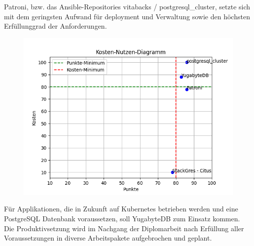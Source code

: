 \documentclass{ksgr_styles}
\begin{document}
\begin{managementsummary}
\begin{flushleft}
            Patroni, bzw. das \Gls{Ansible}-Repositories vitabacks / postgresql\_cluster, setzte sich mit dem geringsten Aufwand für deployment und Verwaltung sowie den höchsten Erfüllunggrad der Anforderungen.\\
    \begin{figure}[H]
        \centering
        \includegraphics[width=0.75\linewidth]{source/cost_benefit_diagram/cost_benefit_diagram}
        \label{fig:cost_benefit_diagram_management_summary}
    \end{figure}
            Für Applikationen, die in Zukunft auf \Gls{Kubernetes} betrieben werden und eine \Gls{PostgreSQL} Datenbank voraussetzen, soll YugabyteDB zum Einsatz kommen.\\
            Die Produktivsetzung wird im Nachgang der Diplomarbeit nach Erfüllung aller Voraussetzungen in diverse Arbeitspakete aufgebrochen und geplant.
        \end{flushleft}
    \end{managementsummary}

    \pagestyle{headings}
    \clearpage
        \hypersetup{hidelinks}
        \tableofcontents

    \thispagestyle{fancy} %
%    
    \startThesis %
    
    
    
    
    
\end{document}
